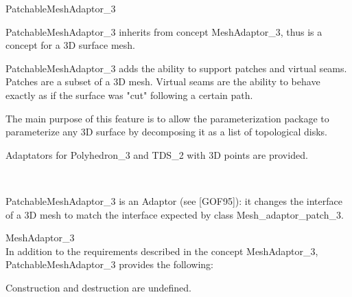 

\begin{ccRefConcept}{PatchableMeshAdaptor_3}


\ccDefinition

PatchableMeshAdaptor\_3 inherits from concept MeshAdaptor\_3, thus is a concept for a 3D surface mesh.

PatchableMeshAdaptor\_3 adds the ability to support patches and virtual seams. Patches are a subset of a 3D mesh. Virtual seams are the ability to behave exactly as if the surface was "cut" following a certain path.

The main purpose of this feature is to allow the parameterization package to parameterize any 3D surface by decomposing it as a list of topological disks.


\ccHasModels

Adaptators for Polyhedron\_3 and TDS\_2 with 3D points are provided.

 \\



PatchableMeshAdaptor\_3 is an Adaptor (see [GOF95]): it changes the interface of a 3D mesh to match the interface expected by class Mesh\_adaptor\_patch\_3.


\ccRefines

MeshAdaptor\_3 \\

In addition to the requirements described in the concept MeshAdaptor\_3,
PatchableMeshAdaptor\_3 provides the following:


\ccCreation
{}  %

Construction and destruction are undefined.



\end{ccRefConcept}
